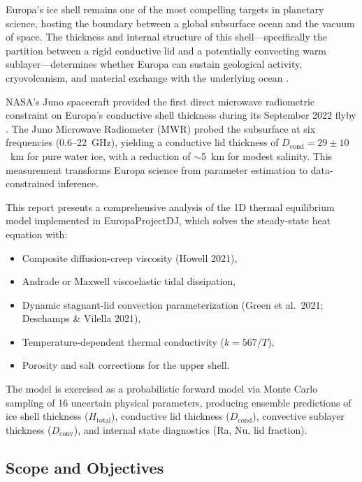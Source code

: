 \documentclass[11pt,letterpaper]{article}
\begin{document}
Europa's ice shell remains one of the most compelling targets in planetary science, hosting the boundary between a global subsurface ocean and the vacuum of space. The thickness and internal structure of this shell---specifically the partition between a rigid conductive lid and a potentially convecting warm sublayer---determines whether Europa can sustain geological activity, cryovolcanism, and material exchange with the underlying ocean \citep{barr2009,billings2005,mckinnon1999}.

NASA's Juno spacecraft provided the first direct microwave radiometric constraint on Europa's conductive shell thickness during its September 2022 flyby \citep{levin2025}. The Juno Microwave Radiometer (MWR) probed the subsurface at six frequencies (0.6--22~GHz), yielding a conductive lid thickness of $D_\mathrm{cond} = 29 \pm 10$~km for pure water ice, with a reduction of $\sim$5~km for modest salinity. This measurement transforms Europa science from parameter estimation to data-constrained inference.

This report presents a comprehensive analysis of the 1D thermal equilibrium model implemented in EuropaProjectDJ, which solves the steady-state heat equation with:
\begin{itemize}[nosep]
  \item Composite diffusion-creep viscosity (Howell 2021),
  \item Andrade or Maxwell viscoelastic tidal dissipation,
  \item Dynamic stagnant-lid convection parameterization (Green et al.\ 2021; Deschamps \& Vilella 2021),
  \item Temperature-dependent thermal conductivity ($k = 567/T$),
  \item Porosity and salt corrections for the upper shell.
\end{itemize}

The model is exercised as a probabilistic forward model via Monte Carlo sampling of 16 uncertain physical parameters, producing ensemble predictions of ice shell thickness ($H_\mathrm{total}$), conductive lid thickness ($D_\mathrm{cond}$), convective sublayer thickness ($D_\mathrm{conv}$), and internal state diagnostics (Ra, Nu, lid fraction).

\subsection{Scope and Objectives}
\end{document}

